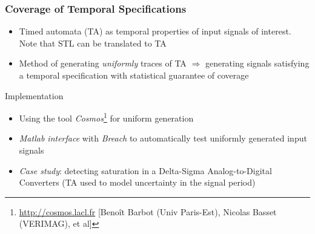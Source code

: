 \begin{frame}
\frametitle{Coverage of Temporal Specifications}
\fontsize{12pt}{12pt}\selectfont
\begin{itemize}
\item Timed automata (TA) as temporal properties of input signals of interest. Note that STL can be translated to TA
\item Method of generating {\em uniformly} traces of TA $\Rightarrow$ generating signals satisfying a temporal specification with statistical guarantee of coverage 
\end{itemize} 
\alert{Implementation}
\begin{itemize}
\item Using the tool {\em Cosmos}\footnote{\url{http://cosmos.lacl.fr} [Beno{\^i}t Barbot (Univ Paris-Est), Nicolas Basset (VERIMAG), et al]} for uniform generation
\item {\em Matlab interface} with {\em Breach} to automatically test uniformly generated input signals
\item {\em Case study}:  detecting saturation in a Delta-Sigma Analog-to-Digital Converters (TA used to model uncertainty in the signal period)
\end{itemize}
\end{frame}


